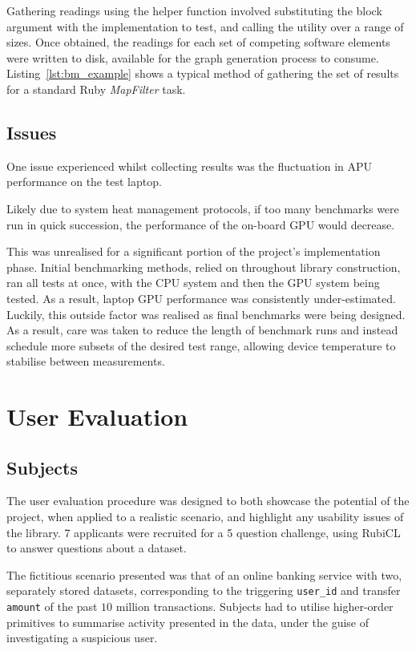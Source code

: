 Gathering readings using the helper function involved substituting the block argument with the implementation to test, and calling the utility over a range of sizes.
Once obtained, the readings for each set of competing software elements were written to disk, available for the graph generation process to consume.
Listing~\ref{lst:bm_example} shows a typical method of gathering the set of results for a standard Ruby \emph{MapFilter} task.


\subsection{Issues}
One issue experienced whilst collecting results was the fluctuation in \ac{APU} performance on the test laptop.

Likely due to system heat management protocols, if too many benchmarks were run in quick succession, the performance of the on-board \ac{GPU} would decrease.

This was unrealised for a significant portion of the project's implementation phase. Initial benchmarking methods, relied on throughout library construction, ran all tests at once, with the \ac{CPU} system and then the \ac{GPU} system being tested. As a result, laptop \ac{GPU} performance was consistently under-estimated. Luckily, this outside factor was realised as final benchmarks were being designed. As a result, care was taken to reduce the length of benchmark runs and instead schedule more subsets of the desired test range, allowing device temperature to stabilise between measurements.

\section{User Evaluation}
\subsection{Subjects}
The user evaluation procedure was designed to both showcase the potential of the project, when applied to a realistic scenario, and highlight any usability issues of the library.
7 applicants were recruited for a 5 question challenge, using RubiCL to answer questions about a dataset.

The fictitious scenario presented was that of an online banking service with two, separately stored datasets, corresponding to the triggering \verb|user_id| and transfer \verb|amount| of the past $10$ million transactions. Subjects had to utilise higher-order primitives to summarise activity presented in the data, under the guise of investigating a suspicious user.

